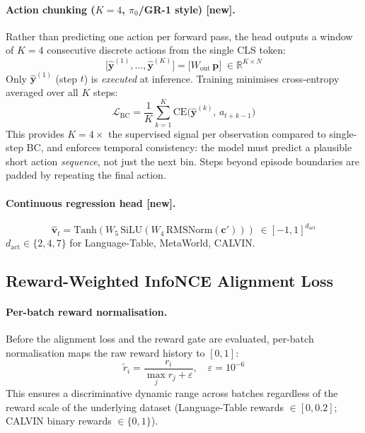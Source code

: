 \documentclass{article}
\newcommand{\NEW}{\textcolor{NewOrange}{\textbf{[new]}}\xspace}
\begin{document}
\paragraph{Action chunking (\boldmath$K\!=\!4$, $\pi_0$/GR-1 style) \NEW.}
Rather than predicting one action per forward pass, the head outputs a
window of $K{=}4$ consecutive discrete actions from the single CLS token:
\begin{equation}
  \bigl[\hat{\mathbf{y}}^{(1)},\ldots,\hat{\mathbf{y}}^{(K)}\bigr]
  = \bigl[W_{\mathrm{out}}\,\mathbf{p}\bigr]
    \;\in\mathbb{R}^{K\times N}
  \label{eq:chunk_logits}
\end{equation}
Only $\hat{\mathbf{y}}^{(1)}$ (step $t$) is \emph{executed} at inference.
Training minimises cross-entropy averaged over all $K$ steps:
\begin{equation}
  \mathcal{L}_{\mathrm{BC}}
  = \frac{1}{K}\sum_{k=1}^{K}
    \mathrm{CE}\!\bigl(\hat{\mathbf{y}}^{(k)},\,a_{t+k-1}\bigr)
  \label{eq:chunk_ce}
\end{equation}
This provides $K\!=\!4\times$ the supervised signal per observation
compared to single-step BC, and enforces temporal consistency:
the model must predict a plausible short action \emph{sequence},
not just the next bin.
Steps beyond episode boundaries are padded by repeating the final action.

\paragraph{Continuous regression head \NEW.}
\begin{equation}
  \hat{\mathbf{v}}_t = \mathrm{Tanh}(W_5\,\mathrm{SiLU}(W_4\,\mathrm{RMSNorm}(\mathbf{c}')))
  \;\in[-1,1]^{d_{\mathrm{act}}}
\end{equation}
$d_{\mathrm{act}}\!\in\!\{2,4,7\}$ for Language-Table, MetaWorld, CALVIN.

\subsection{Reward-Weighted InfoNCE Alignment Loss}
\label{sec:alignment}

\paragraph{Per-batch reward normalisation.}
Before the alignment loss and the reward gate are evaluated, per-batch
normalisation maps the raw reward history to $[0,1]$:
\begin{equation}
  \tilde{r}_i = \frac{r_i}{\max_j r_j + \varepsilon}, \quad \varepsilon=10^{-6}
  \label{eq:batch_norm}
\end{equation}
This ensures a discriminative dynamic range across batches regardless of the
reward scale of the underlying dataset (Language-Table rewards $\in[0,0.2]$;
CALVIN binary rewards $\in\{0,1\}$).
\end{document}
